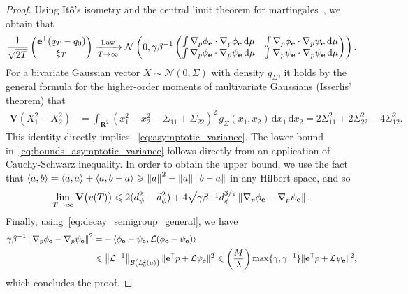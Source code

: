 \documentclass[11pt,a4paper]{article}
\newcommand{\var}[0]{\mathbf{V}}
\newcommand{\real}{\mathbf R}
\newcommand{\grad}{\nabla}
\newcommand{\vect}[1]{\boldsymbol{\mathbf #1}}
\renewcommand{\d}{\mathrm d}
\renewcommand{\t}{\mathsf T}
\theoremstyle{plain}
\numberwithin{equation}{section}
\renewcommand{\leq}{\leqslant}
\renewcommand{\geq}{\geqslant}
\begin{document}
\begin{proof}
    Using It\^o's isometry and the central limit theorem for martingales~\cite[Theorem 3.3]{pavliotis2008multiscale},
    we obtain that
    \[
        \frac{1}{\sqrt{2T}}
        \begin{pmatrix}
            \vect e^\t (q_T - q_0) \\
            \xi_T
        \end{pmatrix}
        \xrightarrow[T \to \infty]{\rm Law}
        \mathcal N \left(0,
            \gamma \beta^{-1}
            \begin{pmatrix}
                \int \grad_p \phi_{\vect e} \cdot \grad_p \phi_{\vect e} \, \d \mu & \int \grad_p \phi_{\vect e} \cdot \grad_p \psi_{\vect e} \, \d \mu \\
                \int \grad_p \phi_{\vect e} \cdot \grad_p \psi_{\vect e} \, \d \mu & \int \grad_p \psi_{\vect e} \cdot \grad_p \psi_{\vect e} \, \d \mu
            \end{pmatrix}
        \right).
    \]
    For a bivariate Gaussian vector $X \sim \mathcal N(0, \Sigma)$ with density $g_{\Sigma}$,
    it holds by the general formula for the higher-order moments of multivariate Gaussians (Isserlis' theorem)
    that
    \begin{align*}
        \var (X_1^2 - X_2^2)
        &= \int_{\real^2} \left( x_1^2 - x_2^2 - \Sigma_{11} + \Sigma_{22} \right)^2 \, g_{\Sigma}(x_1, x_2) \, \d x_1 \, \d x_2
        = 2 \Sigma_{11}^2 + 2 \Sigma_{22}^2 - 4 \Sigma_{12}^2.
    \end{align*}
    This identity directly implies ~\eqref{eq:asymptotic_variance}.
    The lower bound in~\eqref{eq:bounds_asymptotic_variance} follows directly from an application of Cauchy-Schwarz inequality.
    In order to obtain the upper bound,
    we use the fact that $\ip{a}{b} = \ip{a}{a} + \ip{a}{b - a} \geq \norm{a}^2 - \norm{a} \norm{b-a}$ in any Hilbert space,
    and so
    \[
        \lim_{T \to \infty} \var \bigl(v(T)\bigr)
        \leq 2 (d_{\psi}^2 - d_{\phi}^2) + 4 \sqrt{\gamma \beta^{-1}} d_{\phi}^{3/2} \norm{\grad_p \phi_{\vect e} - \grad_p \psi_{\vect e}}.
    \]
    Finally, using~\eqref{eq:decay_semigroup_general}, we have
    \begin{align*}
        \gamma \beta^{-1} \norm{\grad_p \phi_{\vect e} - \grad_p \psi_{\vect e}}^2
        &= - \ip{\phi_{\vect e} - \psi_{\vect e}}{\mathcal L (\phi_{\vect e} - \psi_{\vect e})} \\
        &\leq \norm{\mathcal L^{-1}}[\mathcal B\left(L^2_0(\mu)\right)] \norm*{\vect e^\t p + \mathcal L \psi_{\vect e}}^2
        \leq \left( \frac{M}{\lambda} \right) \max\{\gamma, \gamma^{-1}\} \norm*{\vect e^\t p + \mathcal L \psi_{\vect e}}^2,
    \end{align*}
    which concludes the proof.
\end{proof}
\end{document}
